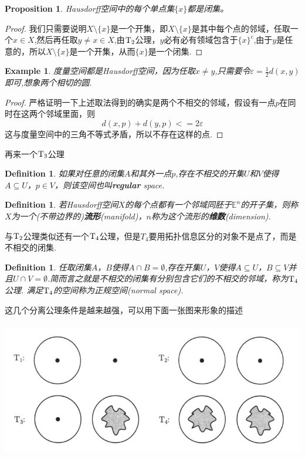 \documentclass{article}
\newtheorem{proposition}[theorem]{Proposition}
\newtheorem{example}[theorem]{Example}
\newtheorem{definition}[theorem]{Definition}
\begin{document}
\begin{proposition}
\rm Hausdorff空间中的每个单点集$\{x\}$都是闭集。
\end{proposition}

\begin{proof}
我们只需要说明$X \setminus \{x\}$是一个开集，即$X \setminus \{x\}$是其中每个点的邻域，任取一个$x \in X$,然后再任取$y \neq x \in X$,由$\rm T_2$公理，$y$必有必有领域包含于$\{x\}^c$,由于$y$是任意的，所以$X \setminus \{x\}$是一个开集，从而$\{x\}$是一个闭集.
\end{proof}

\begin{example}
度量空间都是\rm Hausdorff空间，因为任取$x \neq y$,只需要令$\varepsilon = \frac{1}{2}d(x,y)$即可,想象两个相切的圆.
\end{example}

\begin{proof}
严格证明一下上述取法得到的确实是两个不相交的邻域，假设有一点$p$在同时在这两个邻域里面，则\[d(x,p) + d(y,p) <= 2\varepsilon\]这与度量空间中的三角不等式矛盾，所以不存在这样的点.
\end{proof}

再来一个$\rm T_3$公理

\begin{definition}
如果对任意的闭集$A$和其外一点$p$,存在不相交的开集$U$和$V$使得$A \subseteq U$，$p \in V$，则该空间也叫\rm \textbf{regular} space.
\end{definition}

\begin{definition}
若\rm Hausdorff空间$X$的每个点都有一个邻域同胚于$\mathbb{E}^n$的开子集，则称$X$为一个(不带边界的)\textbf{流形}(manifold)，$n$称为这个流形的\textbf{维数}(\rm dimension).
\end{definition}


与$\rm T_2$公理类似还有一个$\rm T_4$公理，但是$T_4$要用拓扑信息区分的对象不是点了，而是不相交的闭集.

\begin{definition}
任取闭集$A$，$B$使得$A \cap B = \emptyset$,存在开集$U$，$V$使得$A \subseteq U$，$B \subseteq V$并且$U \cap V = \emptyset$.简而言之就是不相交的闭集有分别包含它们的不相交的邻域，称为$\rm T_4$公理. 满足$\rm T_4$的空间称为\textsf{正规空间}(\rm normal space).
\end{definition}

这几个分离公理条件是越来越强，可以用下面一张图来形象的描述


\begin{center}
\includegraphics[width=14cm, height=6cm]{images/separation-axiom.png}
\end{center}
\end{document}
